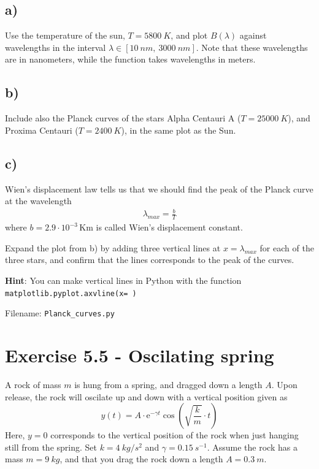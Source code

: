 \documentclass[10pt,a4paper]{article}
\renewcommand{\exp}{\mathrm{e}^}
\begin{document}
\subsection*{a)}
Use the temperature of the sun, $T = \SI{5800}{K}$, and plot $B(\lambda)$ against wavelengths in the interval $\lambda \in [\SI{10}{nm},\ \SI{3000}{nm}]$. Note that these wavelengths are in nanometers, while the function takes wavelengths in meters.


\subsection*{b)}
Include also the Planck curves of the stars Alpha Centauri A ($T = \SI{25 000}{K}$), and Proxima Centauri ($T = \SI{2400}{K}$), in the same plot as the Sun.

\subsection*{c)}
Wien's displacement law tells us that we should find the peak of the Planck curve at the wavelength
\begin{align*}
\lambda_{max} = \frac{b}{T}
\end{align*}
where $b = 2.9\cdot 10^{-3}\,\mathrm{Km}$ is called Wien's displacement constant.

Expand the plot from b) by adding three vertical lines at $x = \lambda_{max}$ for each of the three stars, and confirm that the lines corresponds to the peak of the curves.

\textbf{Hint}: You can make vertical lines in Python with the function \texttt{matplotlib.pyplot.axvline(x= )}

Filename: \texttt{Planck\_curves.py}




\section*{Exercise 5.5 - Oscilating spring}
A rock of mass $m$ is hung from a spring, and dragged down a length $A$. Upon release, the rock will oscilate up and down with a vertical position given as
\[	y(t) = A\cdot \exp{-\gamma t}\cos\left(\sqrt{\frac{k}{m}}\cdot t\right)
\]
Here, $y=0$ corresponds to the vertical position of the rock when just hanging still from the spring. Set $k = \SI{4}{kg/s^2}$ and $\gamma = \SI{0.15}{s^{-1}}$. Assume the rock has a mass $m = \SI{9}{kg}$, and that you drag the rock down a length $A = \SI{0.3}{m}$.
\end{document}
